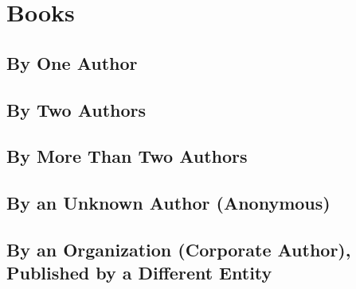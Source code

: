 \documentclass{article}
\newcommand{\textarabic}[1]     %
    {\foreignlanguage{arabic}{{\arabicfont #1}}}
\begin{document}
	

\section{Books} %
\label{sec:books}

\subsection{By One Author} %
\label{ssub:by_one_author}
\begin{refsection}
	\nocite{Davis:1998we,Shen-Fu:2011vw}
	\printbibliography[heading=none]
\end{refsection}
\subsection{By Two Authors} %
\label{ssub:by_two_authors}
\begin{refsection}
	\nocite{Dorris:1999wo}
	\printbibliography[heading=none]
\end{refsection}
\subsection{By More Than Two Authors} %
\label{ssub:by_more_than_two_authors}
\begin{refsection}
	\nocite{Charon:2017tw}
	\printbibliography[heading=none]
\end{refsection}
\subsection{By an Unknown Author (Anonymous)} %
\label{ssub:by_an_unknown_author_anonymous}
\begin{refsection}
	\nocite{Beowulf:2004th,LazarillodeTormes:1554vl}
	\printbibliography[heading=none]
\end{refsection}
\subsection{By an Organization (Corporate Author), Published by a Different Entity} %
\label{ssub:by_an_organization_corporate_author_published_by_a_different_entity}
\begin{refsection}
	\nocite{United-Nations:1991vc}
	\printbibliography[heading=none]
\end{refsection}
\end{document}
